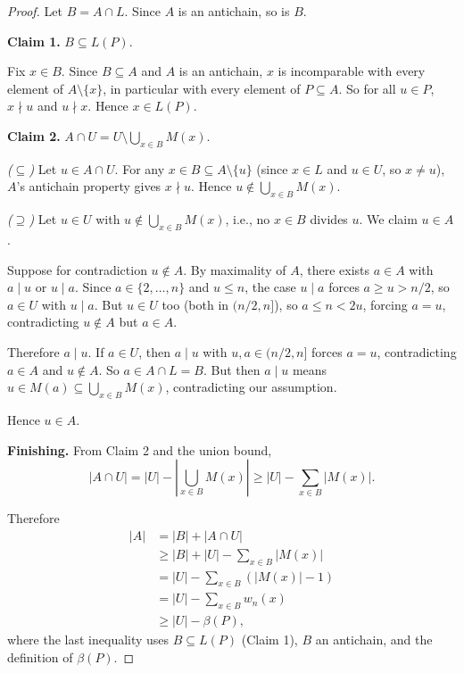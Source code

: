 \documentclass{article}
\begin{document}
\begin{proof}
Let $B = A \cap L$. Since $A$ is an antichain, so is $B$.

\textbf{Claim 1.} $B \subseteq L(P)$.

Fix $x \in B$. Since $B \subseteq A$ and $A$ is an antichain, $x$ is incomparable with every element of $A \setminus \{x\}$, in particular with every element of $P \subseteq A$. So for all $u \in P$, $x \nmid u$ and $u \nmid x$. Hence $x \in L(P)$.

\textbf{Claim 2.} $A \cap U = U \setminus \bigcup_{x \in B} M(x)$.

\emph{($\subseteq$)} Let $u \in A \cap U$. For any $x \in B \subseteq A \setminus \{u\}$ (since $x \in L$ and $u \in U$, so $x \ne u$), $A$'s antichain property gives $x \nmid u$. Hence $u \notin \bigcup_{x \in B} M(x)$.

\emph{($\supseteq$)} Let $u \in U$ with $u \notin \bigcup_{x \in B} M(x)$, i.e., no $x \in B$ divides $u$. We claim $u \in A$.

Suppose for contradiction $u \notin A$. By maximality of $A$, there exists $a \in A$ with $a \mid u$ or $u \mid a$. Since $a \in \{2, \ldots, n\}$ and $u \le n$, the case $u \mid a$ forces $a \ge u > n/2$, so $a \in U$ with $u \mid a$. But $u \in U$ too (both in $(n/2, n]$), so $a \le n < 2u$, forcing $a = u$, contradicting $u \notin A$ but $a \in A$.

Therefore $a \mid u$. If $a \in U$, then $a \mid u$ with $u, a \in (n/2, n]$ forces $a = u$, contradicting $a \in A$ and $u \notin A$. So $a \in A \cap L = B$. But then $a \mid u$ means $u \in M(a) \subseteq \bigcup_{x \in B} M(x)$, contradicting our assumption.

Hence $u \in A$.

\textbf{Finishing.} From Claim 2 and the union bound,
\[|A \cap U| = |U| - \left|\bigcup_{x \in B} M(x)\right| \ge |U| - \sum_{x \in B} |M(x)|.\]

Therefore
\begin{align*}
|A| &= |B| + |A \cap U| \\
    &\ge |B| + |U| - \sum_{x \in B} |M(x)| \\
    &= |U| - \sum_{x \in B} (|M(x)| - 1) \\
    &= |U| - \sum_{x \in B} w_n(x) \\
    &\ge |U| - \beta(P),
\end{align*}
where the last inequality uses $B \subseteq L(P)$ (Claim 1), $B$ an antichain, and the definition of $\beta(P)$.
\end{proof}
\end{document}
